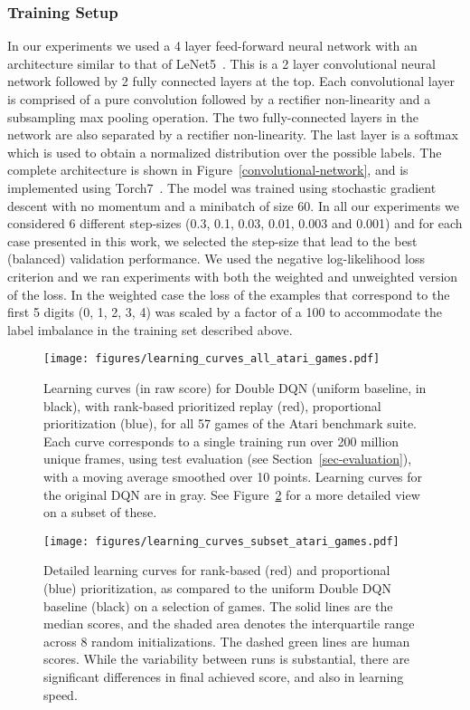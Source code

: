 \documentclass[a4paper]{article}
\begin{document}
\subsubsection{Training Setup}
In our experiments we used a 4 layer feed-forward neural network with an architecture similar to that of LeNet5~\citep{lenet}. This is a 2 layer convolutional neural network followed by 2 fully connected layers at the top. Each convolutional layer is comprised of a pure convolution followed by a rectifier non-linearity and a subsampling max pooling operation. The two fully-connected layers in the network are also separated by a rectifier non-linearity. The last layer is a softmax which is used to obtain a normalized distribution over the possible labels. The complete architecture is shown in Figure~\ref{convolutional-network}, and is implemented using Torch7~\citep{torch7}.
The model was trained using stochastic gradient descent with no momentum and a minibatch of size 60. In all our experiments we considered 6 different step-sizes (0.3, 0.1, 0.03, 0.01, 0.003 and 0.001) and for each case presented in this work, we selected the step-size that lead to the best (balanced) validation performance. We used the negative log-likelihood loss criterion and we ran experiments with both the weighted and unweighted version of the loss. In the weighted case the loss of the examples that correspond to the first 5 digits (0, 1, 2, 3, 4) was scaled by a factor of a 100 to accommodate the label imbalance in the training set described above. 


\begin{figure}[p]
\centerline{
\texttt{[image: figures/learning\_curves\_all\_atari\_games.pdf]}
}
\caption{
\label{fig-atari-all}
Learning curves (in raw score) for Double DQN (uniform baseline, in black), with rank-based prioritized replay (red), proportional prioritization (blue), for all 57 games of the Atari benchmark suite. Each curve corresponds to a single training run over 200 million unique frames, using test evaluation (see Section~\ref{sec-evaluation}),  with a moving average smoothed over 10 points. Learning curves for the original DQN are in gray. See Figure~\ref{fig-atari-subset-detailed} for a more detailed view on a subset of these. 
}
\end{figure}


\begin{figure}[p]
\centerline{
\texttt{[image: figures/learning\_curves\_subset\_atari\_games.pdf]}
}
\caption{
\label{fig-atari-subset-detailed}
Detailed learning curves for rank-based (red) and proportional (blue) prioritization, as compared to the uniform Double DQN baseline (black) on a selection of games.
The solid lines are the median scores, and the shaded area denotes the interquartile range across 8 random initializations.  The dashed green lines are human scores.
While the variability between runs is substantial, there are significant differences in final achieved score, and also in learning speed.
}
\end{figure}
\end{document}
